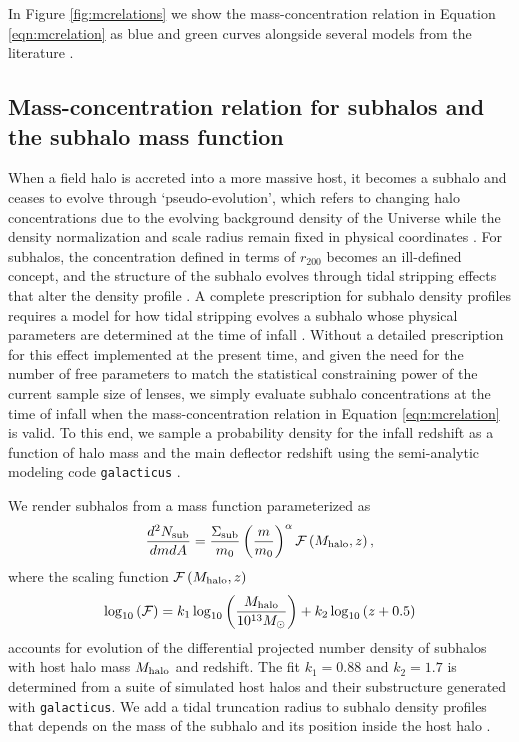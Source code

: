 In Figure \ref{fig:mcrelations} we show the mass-concentration relation in Equation \ref{eqn:mcrelation} as blue and green curves alongside several models from the literature \citep{Bullock++01,Prada++12,Ludlow++16,DiemerJoyce18}. 

\subsection{Mass-concentration relation for subhalos and the subhalo mass function}

When a field halo is accreted into a more massive host, it becomes a subhalo and ceases to evolve through `pseudo-evolution', which refers to changing halo concentrations due to the evolving background density of the Universe while the density normalization and scale radius remain fixed in physical coordinates \citep{Diemer++13}. For subhalos, the concentration defined in terms of $r_{200}$ becomes an ill-defined concept, and the structure of the subhalo evolves through tidal stripping effects that alter the density profile \citep{Errani++17}. A complete prescription for subhalo density profiles requires a model for how tidal stripping evolves a subhalo whose physical parameters are determined at the time of infall \citep{GreenvandenBosch19}. Without a detailed prescription for this effect implemented at the present time, and given the need for the number of free parameters to match the statistical constraining power of the current sample size of lenses, we simply evaluate subhalo concentrations at the time of infall when the mass-concentration relation in Equation \ref{eqn:mcrelation} is valid. To this end, we sample a probability density for the infall redshift as a function of halo mass and the main deflector redshift using the semi-analytic modeling code {\tt{galacticus}} \citep{Benson12}. 

We render subhalos from a mass function parameterized as 
\begin{equation}
\label{eqn:subhalomfunc}
\frac{d^2 N_{\rm{sub}}}{dm dA} =  \frac{\Sigma_{\rm{sub}}}{m_0} \left(\frac{m}{m_0}\right)^{\alpha} {\mathcal{F}} \left(M_{\rm{halo}}, z\right),
\end{equation}
where the scaling function $\mathcal{F} \left(M_{\rm{halo}}, z\right)$ 
\begin{equation}
\label{eqn:scaling}
\log_{10} \left(\mathcal{F}\right) = k_1 \log_{10} \left(\frac{M_{\rm{halo}}}{10^{13} {M_{\odot}}}\right) + k_2 \log_{10}\left(z+0.5\right)
\end{equation}
accounts for evolution of the differential projected number density of subhalos with host halo mass $M_{\rm{halo}}$ and redshift. The fit $k_1 = 0.88$ and $k_2 = 1.7$ is determined from a suite of simulated host halos and their substructure generated with {\tt{galacticus}}. We add a tidal truncation radius to subhalo density profiles that depends on the mass of the subhalo and its position inside the host halo \citep{Gilman++19b}. 

